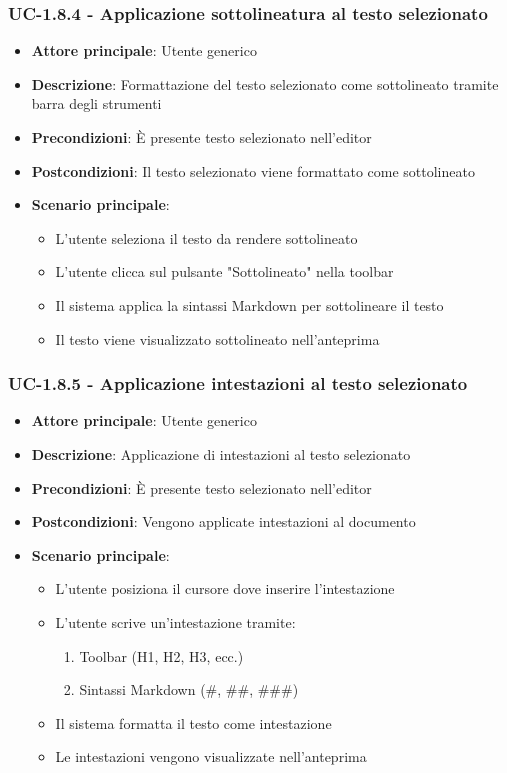 \documentclass[11pt,a4paper]{article}
\begin{document}
\subsubsection{UC-1.8.4 - Applicazione sottolineatura al testo selezionato}
\begin{itemize}
    \item \textbf{Attore principale}: Utente generico
    \item \textbf{Descrizione}: Formattazione del testo selezionato come sottolineato tramite barra degli strumenti
    \item \textbf{Precondizioni}: È presente testo selezionato nell'editor
    \item \textbf{Postcondizioni}: Il testo selezionato viene formattato come sottolineato
    \item \textbf{Scenario principale}:
        \begin{itemize}
            \item L'utente seleziona il testo da rendere sottolineato
            \item L'utente clicca sul pulsante "Sottolineato" nella toolbar
            \item Il sistema applica la sintassi Markdown per sottolineare il testo
            \item Il testo viene visualizzato sottolineato nell'anteprima
        \end{itemize}
\end{itemize}

\subsubsection{UC-1.8.5 - Applicazione intestazioni al testo selezionato}
\begin{itemize}
    \item \textbf{Attore principale}: Utente generico
    \item \textbf{Descrizione}: Applicazione di intestazioni al testo selezionato
    \item \textbf{Precondizioni}: È presente testo selezionato nell’editor
    \item \textbf{Postcondizioni}: Vengono applicate intestazioni al documento
    \item \textbf{Scenario principale}:
        \begin{itemize}
            \item L'utente posiziona il cursore dove inserire l'intestazione
            \item L'utente scrive un'intestazione tramite:
                \begin{enumerate}
                    \item Toolbar (H1, H2, H3, ecc.)
                    \item Sintassi Markdown (\#, \#\#, \#\#\#)
                \end{enumerate}
            \item Il sistema formatta il testo come intestazione
            \item Le intestazioni vengono visualizzate nell'anteprima
        \end{itemize}
\end{itemize}
\end{document}
